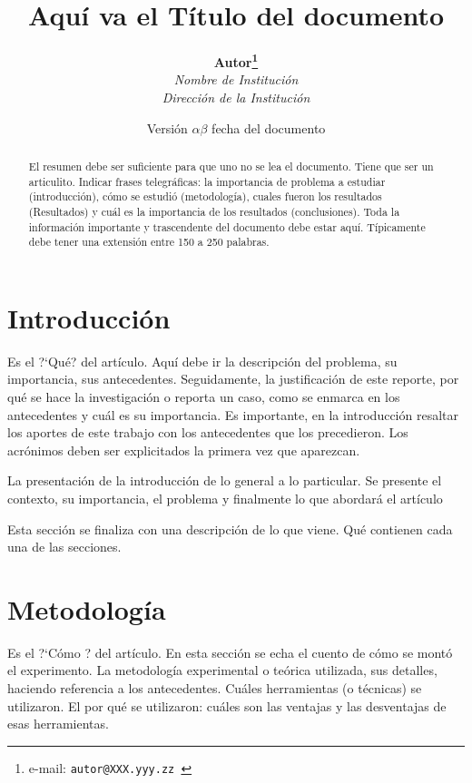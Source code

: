 \documentclass[spanish,notitlepage,letterpaper,11pt]{article} %
\begin{document}
\title{Aquí va el Título del documento}
\author{
\textbf{Autor\thanks{e-mail: \texttt{autor@XXX.yyy.zz } }} \\ 
\textit{Nombre de Institución} \\ 
\textit{Dirección de la Institución}}
\date{Versión $\alpha \beta$ fecha del documento }
\maketitle
\tableofcontents
\begin{abstract}
El resumen debe ser suficiente para que uno no se lea el documento. Tiene que ser un articulito. Indicar frases telegráficas: la importancia de problema a estudiar (introducción), cómo se estudió (metodología), cuales fueron los resultados (Resultados) y cuál es la importancia de los resultados (conclusiones). Toda la información importante y trascendente del documento debe estar aquí. Típicamente debe tener una extensión entre 150 a 250 palabras.  
\end{abstract}

\section{Introducción}
Es el ?`Qué? del artículo. Aquí debe ir la descripción del problema, su importancia, sus antecedentes. Seguidamente, la justificación de este reporte, por qué se hace la investigación o reporta un caso, como se enmarca en los antecedentes y cuál es su importancia. Es importante, en la introducción resaltar los aportes de este trabajo con los antecedentes que los precedieron. Los acrónimos deben ser explicitados la primera vez que aparezcan.

La presentación de la introducción de lo general a lo particular. Se presente el contexto, su importancia, el problema y finalmente lo que abordará el artículo

Esta sección se finaliza con una descripción de lo que viene. Qué contienen cada una de las secciones.

\section{Metodología}
Es el ?`Cómo ? del artículo. En esta sección se echa el cuento de cómo se montó el experimento. La metodología experimental o teórica utilizada, sus detalles, haciendo referencia a los antecedentes. Cuáles herramientas (o técnicas) se utilizaron. El por qué se utilizaron: cuáles son las ventajas y las desventajas de esas herramientas. 
\end{document}
